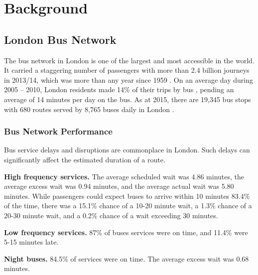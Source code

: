 \chapter{Background}

\section{London Bus Network}

\par The bus network in London is one of the largest and most accessible in the world. It carried a staggering number of passengers with more than 2.4 billion journeys in 2013/14, which was more than any year since 1959 \cite{tfl_annual_report_13/14}.
On an average day during 2005 -- 2010, London residents made 14\% of their trips by bus \cite{tfl_ltds}, pending an average of 14 minutes per day on the bus.
As at 2015, there are 19,345 bus stops with 680 routes served by 8,765 buses daily in London \cite{bus_stop_locations_routes}.


\subsection{Bus Network Performance}

\par Bus service delays and disruptions are commonplace in London. Such delays can significantly affect the estimated duration of a route.

\par \textbf{High frequency services.} The average scheduled wait was 4.86 minutes, the average excess wait was 0.94 minutes, and the average actual wait was 5.80 minutes. While passengers could expect  buses to arrive within 10 minutes 83.4\% of the time, there was a 15.1\% chance of a 10-20 minute wait, a 1.3\% chance of a 20-30 minute wait, and a 0.2\% chance of a wait exceeding 30 minutes.

\par \textbf{Low frequency services.} 87\% of buses services were on time, and 11.4\% were 5-15 minutes late.

\par \textbf{Night buses.} 84.5\% of services were on time. The average excess wait was 0.68 minutes.


